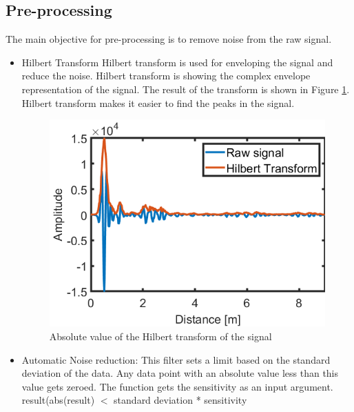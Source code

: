 \subsection{Pre-processing}
The main objective for pre-processing is to remove noise from  the raw signal.  
\begin{itemize}
    \item {Hilbert Transform}
    Hilbert transform is used for enveloping the signal and reduce the noise. Hilbert transform is showing the complex envelope representation of the signal. The result of the transform is shown in Figure \ref{fig:Hilbert}. Hilbert transform makes it easier to find the peaks in the signal.
\begin{figure}
    \centering
    \includegraphics[width=\linewidth]{Figures/Hilbert.png}
    \caption{Absolute value of the Hilbert transform of the signal}
    \label{fig:Hilbert}
\end{figure}
    \item Automatic Noise reduction: This filter sets a limit based on the standard deviation of the data. Any data point with an absolute value less than this value gets zeroed. The function gets the sensitivity as an input argument.\\
    \hspace*{7mm} result(abs(result) $<$ standard deviation * sensitivity
\end{itemize}
